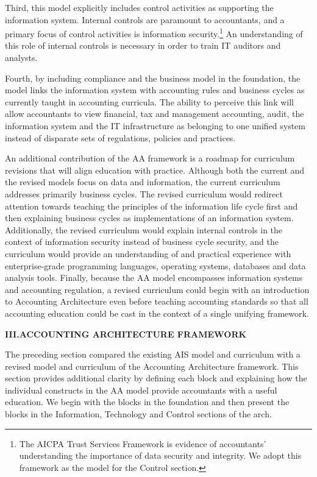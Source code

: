 \documentclass[12pt]{article}
\newcommand{\Section}[2]{\vspace{.2in}\centerline{\normalsize{}\textbf{#1\quad{}\MakeUppercase{#2}}}\nopagebreak{}\smallskip{}\indent{}}
\begin{document}
Third, this model explicitly includes control activities as supporting the information system. Internal controls are paramount to accountants, and a primary focus of control activities is information security.\footnote{The AICPA Trust Services Framework is evidence of accountants' understanding the importance of data security and integrity. We adopt this framework as the model for the Control section.} An understanding of this role of internal controls is necessary in order to train IT auditors and analysts.

Fourth, by including compliance and the business model in the foundation, the model links the information system with accounting rules and business cycles as currently taught in accounting curricula. The ability to perceive this link will allow accountants to view financial, tax and management accounting, audit, the information system and the IT infrastructure as belonging to one unified system instead of disparate sets of regulations, policies and practices.

An additional contribution of the AA framework is a roadmap for curriculum revisions that will align education with practice. Although both the current and the revised models focus on data and information, the current curriculum addresses primarily business cycles. The revised curriculum would redirect attention towards teaching the principles of the information life cycle first and then explaining business cycles as implementations of an information system. Additionally, the revised curriculum would explain internal controls in the context of information security instead of business cycle security, and the curriculum would provide an understanding of and practical experience with enterprise-grade programming languages, operating systems, databases and data analysis tools. Finally, because the AA model encompasses information systems and accounting regulation, a revised curriculum could begin with an introduction to Accounting Architecture even before teaching accounting standards so that all accounting education could be cast in the context of a single unifying framework.

\Section{III.}{Accounting Architecture Framework}
The preceding section compared the existing AIS model and curriculum with a revised model and curriculum of the Accounting Architecture framework. This section provides additional clarity by defining each block and explaining how the individual constructs in the AA model provide accountants with a useful education. We begin with the blocks in the foundation and then present the blocks in the Information, Technology and Control sections of the arch.
\end{document}
